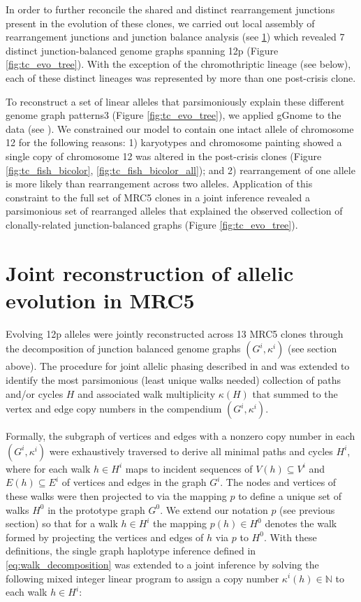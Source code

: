 \documentclass[phd,tocprelim]{cornell}
\begin{document}
In order to further reconcile the shared and distinct rearrangement junctions present in the evolution of these clones, we carried out local assembly of rearrangement junctions and junction balance analysis (see \ref{sec:tc_joint_jabba}) which revealed 7 distinct junction-balanced genome graphs spanning 12p (Figure \ref{fig:tc_evo_tree}). With the exception of the chromothriptic lineage (see below), each of these distinct lineages was represented by more than one post-crisis clone.

To reconstruct a set of linear alleles that parsimoniously explain these different genome graph patterns3 (Figure \ref{fig:tc_evo_tree}), we applied gGnome to the data (see ). We constrained our model to contain one intact allele of chromosome 12 for the following reasons: 1) karyotypes and chromosome painting showed a single copy of chromosome 12 was altered in the post-crisis clones (Figure \ref{fig:tc_fish_bicolor}, \ref{fig:tc_fish_bicolor_all}); and 2) rearrangement of one allele is more likely than rearrangement across two alleles. Application of this constraint to the full set of MRC5 clones in a joint inference revealed a parsimonious set of rearranged alleles that explained the observed collection of clonally-related junction-balanced graphs (Figure \ref{fig:tc_evo_tree}).

\section{Joint reconstruction of allelic evolution in MRC5} \label{sec:tc_joint_jabba}
Evolving 12p alleles were jointly reconstructed across 13 MRC5 clones through the decomposition of junction balanced genome graphs $(G^i,κ^i)$ (see  section above). The procedure for joint allelic phasing described in \cite{Hadi2020-um} and  was extended to identify the most parsimonious (least unique walks needed) collection of paths and/or cycles $H$ and associated walk multiplicity $\kappa(H)$ that summed to the vertex and edge copy numbers in the compendium $(G^i,κ^i)$.

Formally, the subgraph of vertices and edges with a nonzero copy number in each $(G^i,κ^i)$ were exhaustively traversed to derive all minimal paths and cycles $H^i$, where for each walk $h \in H^i$ maps to incident sequences of $V(h) \subseteq V^i$ and $E(h) \subseteq E^i$ of vertices and edges in the graph $G^i$.  The nodes and vertices of these walks were then projected to via the mapping $p$ to define a unique set of walks $H^0$ in the prototype graph $G^0$. We extend our notation $p$ (see previous section) so that for a walk $h \in H^i$ the mapping $p(h) \in H^0$ denotes the walk formed by projecting the vertices and edges of $h$ via $p$ to $H^0$.  With these definitions, the single graph haplotype inference defined in \ref{eq:walk_decomposition} was extended to a joint inference by solving the following mixed integer linear program to assign a copy number $\kappa^i(h) \in \mathbb{N}$ to each walk $h \in H^i$:
\end{document}

